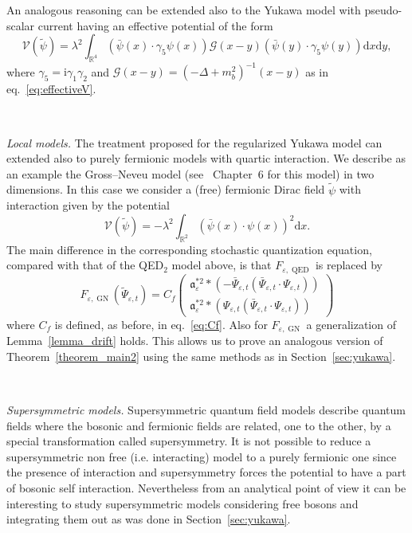 \documentclass{article}
\newcommand{\asterisk}{\mathord{*}}
\newcommand{\mathd}{\mathrm{d}}
\newcommand{\mathi}{\mathrm{i}}
\newcommand{\tmop}[1]{\ensuremath{\operatorname{#1}}}
\newcommand{\tmtextit}[1]{{\itshape{#1}}}
\begin{document}
An analogous reasoning can be extended also to the Yukawa model with
pseudo-scalar current having an effective potential of the form
\[ \mathcal{V} (\tilde{\psi}) = \lambda^2 \int_{\mathbb{R}^4} (\bar{\psi} (x)
   \cdot \gamma_5 \psi (x)) \mathcal{G} (x - y) (\bar{\psi} (y) \cdot \gamma_5
   \psi (y)) \mathd x \mathd y, \]
where $\gamma_5 = \mathi \gamma_1 \gamma_2$ and $\mathcal{G} (x - y) = (-
\Delta + m_b^2)^{- 1} (x - y)$ as in eq.~{\eqref{eq:effectiveV}}.

\

\tmtextit{Local models.} The treatment proposed for the regularized Yukawa
model can extended also to purely fermionic models with quartic interaction.
We describe as an example the Gross--Neveu model
(see~{\cite{mastropietro_non-perturbative_2008}} Chapter~6 for this model) in
two dimensions. In this case we consider a (free) fermionic Dirac field
$\tilde{\psi}$ with interaction given by the potential
\[ \mathcal{V} (\tilde{\psi}) = - \lambda^2 \int_{\mathbb{R}^2} (\bar{\psi}
   (x) \cdot \psi (x))^2 \mathd x. \]
The main difference in the corresponding stochastic quantization equation,
compared with that of the QED$_2$ model above, is that $F_{\varepsilon,
\tmop{QED}}$ is replaced by
\[ F_{\varepsilon, \tmop{GN}} (\tilde{\Psi}_{\varepsilon, t}) = C_f \left(
   \begin{array}{l}
     \mathfrak{a}_{\varepsilon}^{\asterisk 2} \ast (- \bar{\Psi}_{\varepsilon,
     t} (\bar{\Psi}_{\varepsilon, t} \cdot \Psi_{\varepsilon, t}))\\
     \mathfrak{a}_{\varepsilon}^{\asterisk 2} \ast (\Psi_{\varepsilon, t}
     (\bar{\Psi}_{\varepsilon, t} \cdot \Psi_{\varepsilon, t}))
   \end{array} \right) \]
where $C_f$ is defined, as before, in eq.~{\eqref{eq:Cf}}. Also for
$F_{\varepsilon, \tmop{GN}}$ a generalization of Lemma~\ref{lemma_drift}
holds. This allows us to prove an analogous version of
Theorem~\ref{theorem_main2} using the same methods as in
Section~\ref{sec:yukawa}.

\

\tmtextit{Supersymmetric models.} Supersymmetric quantum field models
describe quantum fields where the bosonic and fermionic fields are related,
one to the other, by a special transformation called supersymmetry. It is not
possible to reduce a supersymmetric non free (i.e. interacting) model to a
purely fermionic one since the presence of interaction and supersymmetry
forces the potential to have a part of bosonic self interaction. Nevertheless
from an analytical point of view it can be interesting to study supersymmetric
models considering free bosons and integrating them out as was done in
Section~\ref{sec:yukawa}.
\end{document}
